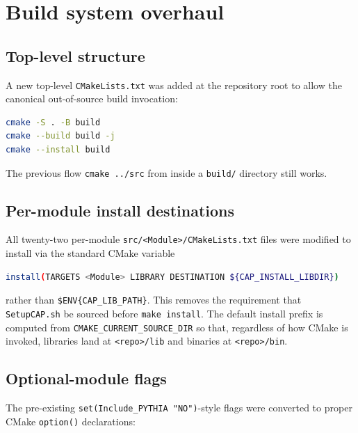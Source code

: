 \documentclass[11pt,a4paper]{article}
\begin{document}
\section{Build system overhaul}

\subsection{Top-level structure}

A new top-level \texttt{CMakeLists.txt} was added at the repository root to
allow the canonical out-of-source build invocation:

\begin{lstlisting}[language=bash]
cmake -S . -B build
cmake --build build -j
cmake --install build
\end{lstlisting}

\noindent
The previous flow \texttt{cmake ../src} from inside a \texttt{build/}
directory still works.

\subsection{Per-module install destinations}

All twenty-two per-module \texttt{src/<Module>/CMakeLists.txt} files were
modified to install via the standard CMake variable

\begin{lstlisting}[language=bash]
install(TARGETS <Module> LIBRARY DESTINATION ${CAP_INSTALL_LIBDIR})
\end{lstlisting}

\noindent
rather than \verb|$ENV{CAP_LIB_PATH}|. This removes the requirement that
\texttt{SetupCAP.sh} be sourced before \texttt{make install}.
The default install prefix is computed from
\texttt{CMAKE\_CURRENT\_SOURCE\_DIR} so that, regardless of how CMake is
invoked, libraries land at \texttt{<repo>/lib} and binaries at
\texttt{<repo>/bin}.

\subsection{Optional-module flags}

The pre-existing \verb|set(Include_PYTHIA "NO")|-style flags were converted to
proper CMake \texttt{option()} declarations:
\end{document}
